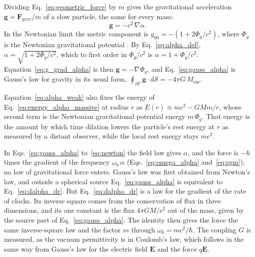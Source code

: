 \documentclass[aps,prd,onecolumn,tightenlines,nofootinbib,notitlepage,11pt,floatfix]{revtex4-2}
\theoremstyle{indentedtheorem}
\begin{document}
Dividing Eq.~\eqref{eq:geometric_force} by $m$ gives the gravitational acceleration $\mathbf{g}=\mathbf{F}_\text{grav}/m$ of a slow particle, the same for every mass:
\begin{equation}
    \mathbf{g} = -c^2\,\nabla\alpha .
    \label{eq:g_grad_alpha}
\end{equation}
In the Newtonian limit the metric component is $g_{00}=-(1+2\Phi_g/c^2)$, where $\Phi_g$ is the Newtonian gravitational potential \citep{MTW1973Gravitation}. By Eq.~\eqref{eq:alpha_def}, $\alpha=\sqrt{1+2\Phi_g/c^2}$, which to first order in $\Phi_g/c^2$ is $\alpha=1+\Phi_g/c^2$. Equation~\eqref{eq:g_grad_alpha} is then $\mathbf{g}=-\nabla\Phi_g$, and Eq.~\eqref{eq:gauss_alpha} is Gauss's law for gravity in its usual form, $\oint_{\partial\mathcal{V}}\mathbf{g}\cdot d\boldsymbol{\mathcal{S}}=-4\pi G \, M_\text{enc}$.

Equation~\eqref{eq:alpha_weak} also fixes the energy of Eq.~\eqref{eq:energy_alpha_massive} at radius $r$ as $E(r)\approx mc^2-GMm/r$, whose second term is the Newtonian gravitational potential energy $m \, \Phi_g$. That energy is the amount by which time dilation lowers the particle's rest energy at $r$ as measured by a distant observer, while the local rest energy stays $mc^2$.

In Eqs.~\eqref{eq:gauss_alpha} to~\eqref{eq:newton} the field law gives $\alpha$, and the force is $-\hbar$ times the gradient of the frequency $\omega_0 \, \alpha$ (Eqs.~\eqref{eq:omega_alpha} and~\eqref{eq:sgm}); no law of gravitational force enters. Gauss's law was first obtained from Newton's law, and outside a spherical source Eq.~\eqref{eq:gauss_alpha} is equivalent to Eq.~\eqref{eq:dalpha_dr}. But Eq.~\eqref{eq:dalpha_dr} is a law for the gradient of the rate of clocks. Its inverse square comes from the conservation of flux in three dimensions, and its one constant is the flux $4\pi GM/c^2$ out of the mass, given by the source part of Eq.~\eqref{eq:gauss_alpha}. The identity then gives the force the same inverse-square law and the factor $m$ through $\omega_0=mc^2/\hbar$. The coupling $G$ is measured, as the vacuum permittivity is in Coulomb's law, which follows in the same way from Gauss's law for the electric field $\mathbf{E}$ and the force $q\mathbf{E}$.
\end{document}
